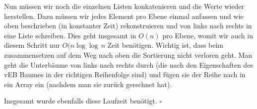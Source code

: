 \documentclass[11pt,a4paper,ngerman]{article}
\begin{document}
Nun müssen wir noch die einzelnen Listen konkatenieren und die Werte wieder herstellen. Dazu müssen wir jedes Element pro Ebene einmal anfassen und wie oben beschrieben (in konstanter Zeit) rekonstruieren und von links nach rechts in eine Liste schreiben. Dies geht insgesamt in $O(n)$ pro Ebene, womit wir auch in diesem Schritt nur $O(n \log \log \, n$ Zeit benötigen. Wichtig ist, dass beim zusammensetzen auf dem Weg nach oben die Sortierung nicht verloren geht. Man geht die Unterbäume von links nach rechts durch (die nach den Eigenschaften des vEB Baumes in der richtigen Reihenfolge sind) und fügen sie der Reihe nach in ein Array ein (nachdem man sie zurück gerechnet hat).

Insgesamt wurde ebenfalls diese Laufzeit benötigt.
\mbox{}\hfill$\square$
\label{LastPage}
\end{document}
